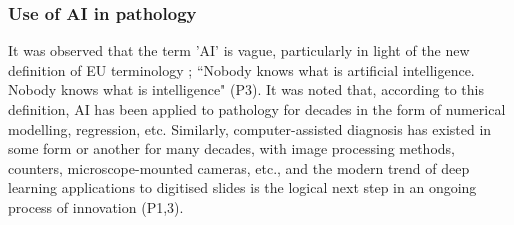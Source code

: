 




\subsubsection{Use of AI in pathology}
It was observed that the term 'AI' is vague,  particularly in light of the new definition of EU terminology \cite{ISO_IEC_22989}; ``Nobody knows what is artificial intelligence. Nobody knows what is intelligence" (P3). It was noted that, according to this definition, AI has been applied to pathology for decades in the form of numerical modelling, regression, etc. Similarly, computer-assisted diagnosis has existed in some form or another for many decades, with image processing methods, counters, microscope-mounted cameras, etc., and the modern trend of deep learning applications to digitised slides is the logical next step in an ongoing process of innovation (P1,3).

